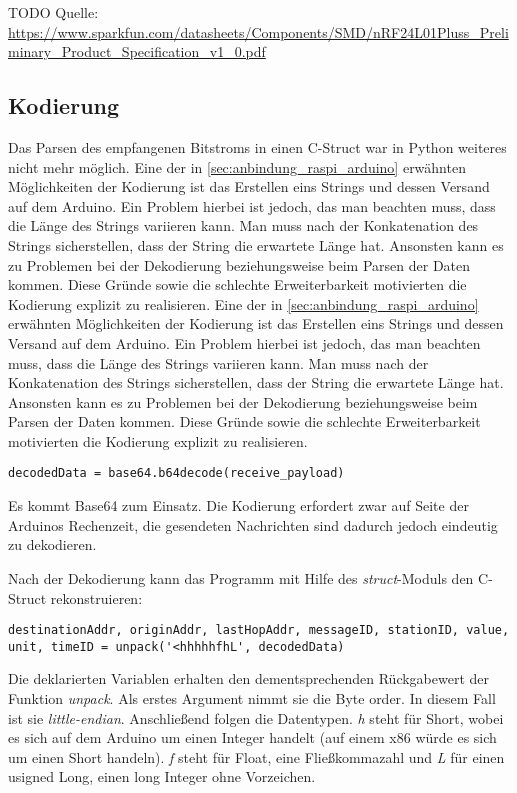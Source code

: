 TODO Quelle: \url{https://www.sparkfun.com/datasheets/Components/SMD/nRF24L01Pluss_Preliminary_Product_Specification_v1_0.pdf}   

\subsection{Kodierung}
Das Parsen des empfangenen Bitstroms in einen C-Struct war in Python weiteres nicht mehr möglich. 
Eine der in \ref{sec:anbindung_raspi_arduino} erwähnten Möglichkeiten der Kodierung ist das Erstellen eins Strings und dessen Versand auf dem Arduino. Ein Problem hierbei ist jedoch, das man beachten muss, dass die Länge des Strings variieren kann. Man muss nach der Konkatenation des Strings sicherstellen, dass der String die erwartete Länge hat. Ansonsten kann es zu Problemen bei der Dekodierung beziehungsweise beim Parsen der Daten kommen. Diese Gründe sowie die schlechte Erweiterbarkeit motivierten die Kodierung explizit zu realisieren. 
Eine der in \ref{sec:anbindung_raspi_arduino} erwähnten Möglichkeiten der Kodierung ist das Erstellen eins Strings und dessen Versand auf dem Arduino. Ein Problem hierbei ist jedoch, das man beachten muss, dass die Länge des Strings variieren kann. Man muss nach der Konkatenation des Strings sicherstellen, dass der String die erwartete Länge hat. Ansonsten kann es zu Problemen bei der Dekodierung beziehungsweise beim Parsen der Daten kommen. Diese Gründe sowie die schlechte Erweiterbarkeit motivierten die Kodierung explizit zu realisieren. 

\lstset{language=python, numbers=none}
\begin{lstlisting}
decodedData = base64.b64decode(receive_payload)
\end{lstlisting}
Es kommt Base64 zum Einsatz. Die Kodierung erfordert zwar auf Seite der Arduinos Rechenzeit, die gesendeten Nachrichten sind dadurch jedoch eindeutig zu dekodieren. 

Nach der Dekodierung kann das Programm mit Hilfe des \textit{struct}-Moduls den C-Struct rekonstruieren:  
\lstset{language=python, numbers=none, breaklines=true}
\begin{lstlisting}
destinationAddr, originAddr, lastHopAddr, messageID, stationID, value, unit, timeID = unpack('<hhhhhfhL', decodedData)
\end{lstlisting}
Die deklarierten Variablen erhalten den dementsprechenden Rückgabewert der Funktion \textit{unpack}. Als erstes Argument nimmt sie die Byte order. In diesem Fall ist sie \textit{little-endian}. Anschließend folgen die Datentypen. \textit{h} steht für Short, wobei es sich auf dem Arduino um einen Integer handelt (auf einem x86 würde es sich um einen Short handeln). \textit{f} steht für Float, eine Fließkommazahl und \textit{L} für einen usigned Long, einen long Integer ohne Vorzeichen. 

